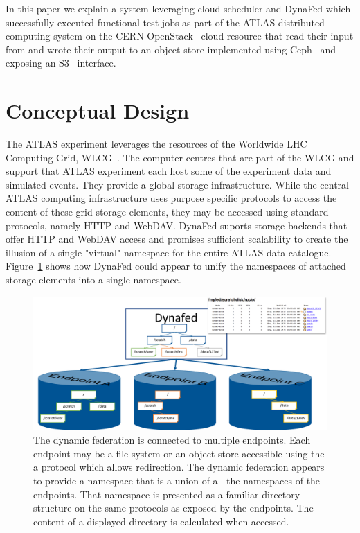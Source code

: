 \documentclass[a4paper]{jpconf}
\begin{document}
In this paper we explain a system leveraging cloud scheduler and DynaFed which successfully executed functional test jobs as part of the ATLAS distributed computing system on the CERN OpenStack~\cite{openstack} cloud resource that read their input from and wrote their output to an object store implemented using Ceph~\cite{ceph} and exposing an S3~\cite{s3} interface.

\section{Conceptual Design}
The ATLAS experiment leverages the resources of the Worldwide LHC Computing Grid, WLCG~\cite{wlcg}. The computer centres that are part of the WLCG and support that ATLAS experiment each host some of the experiment data and simulated events. They provide a global storage infrastructure. While the central ATLAS computing infrastructure uses purpose specific protocols to access the content of these grid storage elements, they may be accessed using standard protocols, namely HTTP and WebDAV. DynaFed suports storage backends that offer HTTP and WebDAV access and promises sufficient scalability to create the illusion of a single "virtual" namespace for the entire ATLAS data catalogue.  Figure~\ref{fig:conceptual-design} shows how DynaFed could appear to unify the namespaces of attached storage elements into a single namespace.

\begin{figure}
  \centering
  \includegraphics[width=\textwidth]{conceptual-design.png}
  \caption{The dynamic federation is connected to multiple endpoints. Each endpoint may be a file system or an object store accessible using the a protocol which allows redirection. The dynamic federation appears to provide a namespace that is a union of all the namespaces of the endpoints. That namespace is presented as a familiar directory structure on the same protocols as exposed by the endpoints. The content of a displayed directory is calculated when accessed.}
  \label{fig:conceptual-design}
\end{figure}
\end{document}
